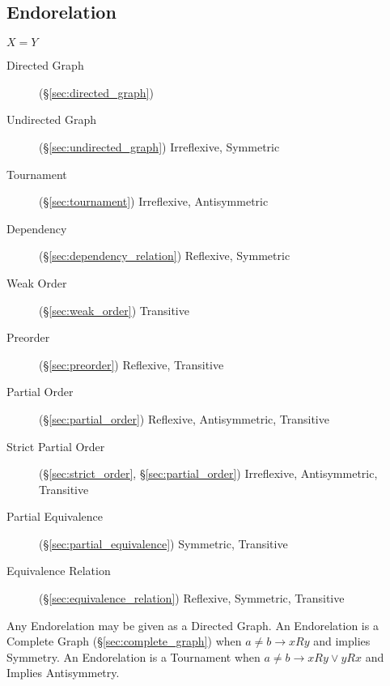 \subsection{Endorelation}\label{sec:endorelation}

$X = Y$

\begin{description}
\item [Directed Graph] (\S\ref{sec:directed_graph})

\item [Undirected Graph] (\S\ref{sec:undirected_graph}) Irreflexive,
  Symmetric

\item [Tournament] (\S\ref{sec:tournament}) Irreflexive, Antisymmetric

\item [Dependency] (\S\ref{sec:dependency_relation}) Reflexive,
  Symmetric

\item [Weak Order] (\S\ref{sec:weak_order}) Transitive

\item [Preorder] (\S\ref{sec:preorder}) Reflexive, Transitive

\item [Partial Order] (\S\ref{sec:partial_order}) Reflexive,
  Antisymmetric, Transitive

\item [Strict Partial Order] (\S\ref{sec:strict_order},
  \S\ref{sec:partial_order}) Irreflexive, Antisymmetric, Transitive

\item [Partial Equivalence] (\S\ref{sec:partial_equivalence})
  Symmetric, Transitive

\item [Equivalence Relation] (\S\ref{sec:equivalence_relation})
  Reflexive, Symmetric, Transitive

\end{description}

Any Endorelation may be given as a Directed Graph. An Endorelation is
a Complete Graph (\S\ref{sec:complete_graph}) when $a \neq b
\rightarrow xRy$ and implies Symmetry. An Endorelation is a Tournament
when $a \neq b \rightarrow xRy \vee yRx$ and Implies Antisymmetry.



